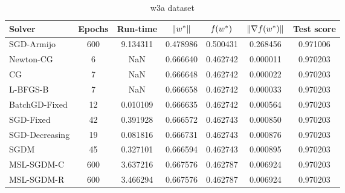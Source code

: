 \begin{table}
\centering
\caption{w3a dataset}
\label{tab:w3a-tab}
\begin{tabular}{lS[drop-zero-decimal]S[round-precision=4]S[round-precision=6]S[round-precision=6]S[exponent-mode=scientific]S[round-precision=6]}
\toprule
Solver & {Epochs} & {Run-time} & {$\lVert w^\ast\rVert$} & {$\operatorname*{\mathit{f}}(w^\ast)$} & {$\lVert\nabla f(w^\ast)\rVert$} & {Test score} \\
\midrule
SGD-Armijo & 600 & 9.134311 & 0.478986 & 0.500431 & 0.268456 & 0.971006 \\
Newton-CG & 6 & NaN & 0.666640 & 0.462742 & 0.000011 & 0.970203 \\
CG & 7 & NaN & 0.666648 & 0.462742 & 0.000022 & 0.970203 \\
L-BFGS-B & 7 & NaN & 0.666658 & 0.462742 & 0.000033 & 0.970203 \\
BatchGD-Fixed & 12 & 0.010109 & 0.666635 & 0.462742 & 0.000564 & 0.970203 \\
SGD-Fixed & 42 & 0.391928 & 0.666572 & 0.462743 & 0.000850 & 0.970203 \\
SGD-Decreasing & 19 & 0.081816 & 0.666731 & 0.462743 & 0.000876 & 0.970203 \\
SGDM & 45 & 0.327101 & 0.666594 & 0.462743 & 0.000895 & 0.970203 \\
MSL-SGDM-C & 600 & 3.637216 & 0.667576 & 0.462787 & 0.006924 & 0.970203 \\
MSL-SGDM-R & 600 & 3.466294 & 0.667576 & 0.462787 & 0.006924 & 0.970203 \\
\bottomrule
\end{tabular}
\end{table}

